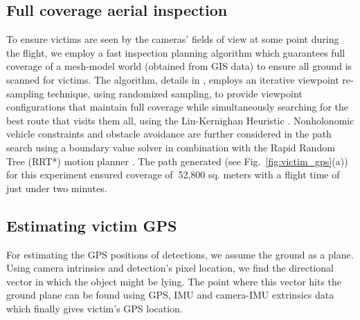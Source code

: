 \documentclass[runningheads]{llncs}
\begin{document}
\subsection{Full coverage aerial inspection}

To ensure victims are seen by the cameras' fields of view at some point during the flight, we employ a fast inspection planning algorithm which guarantees full coverage of a mesh-model world (obtained from GIS data) to ensure all ground is scanned for victims. The algorithm, details in \cite{7140101}, employs an iterative viewpoint re-sampling technique, using randomized sampling, to provide viewpoint configurations that maintain full coverage while simultaneously searching for the best route that visits them all, using the Lin-Kernighan Heuristic \cite{lin1973effective}. Nonholonomic vehicle constraints and obstacle avoidance are further considered in the path search using a boundary value solver in combination with the Rapid Random Tree (RRT*) motion planner \cite{RRTS1a}. The path generated (see Fig.~\ref{fig:victim_gps}(a)) for this experiment ensured coverage of $~$52,800 sq. meters with a flight time of just under two minutes.

\subsection{Estimating victim GPS}

For estimating the GPS positions of detections, we assume the ground as a plane. Using camera intrinsics and detection's pixel location, we find the directional vector in which the object might be lying. The point where this vector hits the ground plane can be found using GPS, IMU and camera-IMU extrinsics data which finally gives victim's GPS location.
\end{document}
